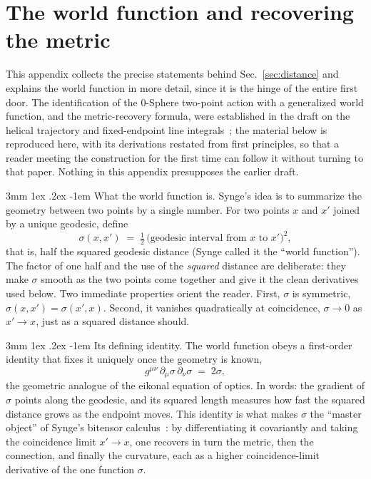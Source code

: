 \documentclass[%
 reprint, amsmath,amssymb, aps, prb, ]{revtex4-2}
\makeatletter
\numberwithin{equation}{section}
\renewcommand\paragraph{%
  \@startsection{paragraph}{4}{\z@}%
    {3mm \@plus 1ex \@minus .2ex}%
    {-1em}%
    {\normalfont\normalsize\itshape}}
\makeatother
\begin{document}
\section{The world function and recovering the metric}
\label{app:worldfn}

This appendix collects the precise statements behind Sec.~\ref{sec:distance} and explains the world function in more detail, since it is the hinge of the entire first door. The identification of the 0-Sphere two-point action with a generalized world function, and the metric-recovery formula, were established in the draft on the helical trajectory and fixed-endpoint line integrals~\cite{hanamura51}; the material below is reproduced here, with its derivations restated from first principles, so that a reader meeting the construction for the first time can follow it without turning to that paper. Nothing in this appendix presupposes the earlier draft.

\paragraph{What the world function is.}
Synge's idea is to summarize the geometry between two points by a single number. For two points $x$ and $x'$ joined by a unique geodesic, define
\begin{equation}
\sigma(x,x') \;=\; \tfrac12\,\big(\text{geodesic interval from $x$ to $x'$}\big)^2,
\label{eq:synge-def}
\end{equation}
that is, half the squared geodesic distance (Synge called it the ``world function''). The factor of one half and the use of the \emph{squared} distance are deliberate: they make $\sigma$ smooth as the two points come together and give it the clean derivatives used below. Two immediate properties orient the reader. First, $\sigma$ is symmetric, $\sigma(x,x')=\sigma(x',x)$. Second, it vanishes quadratically at coincidence, $\sigma\to 0$ as $x'\to x$, just as a squared distance should.

\paragraph{Its defining identity.}
The world function obeys a first-order identity that fixes it uniquely once the geometry is known,
\begin{equation}
g^{\mu\nu}\,\partial_\mu\sigma\,\partial_\nu\sigma \;=\; 2\sigma,
\label{eq:eikonal}
\end{equation}
the geometric analogue of the eikonal equation of optics. In words: the gradient of $\sigma$ points along the geodesic, and its squared length measures how fast the squared distance grows as the endpoint moves. This identity is what makes $\sigma$ the ``master object'' of Synge's bitensor calculus~\cite{Synge1960,DeWitt1960,Poisson2011}: by differentiating it covariantly and taking the coincidence limit $x'\to x$, one recovers in turn the metric, then the connection, and finally the curvature, each as a higher coincidence-limit derivative of the one function $\sigma$.
\end{document}
